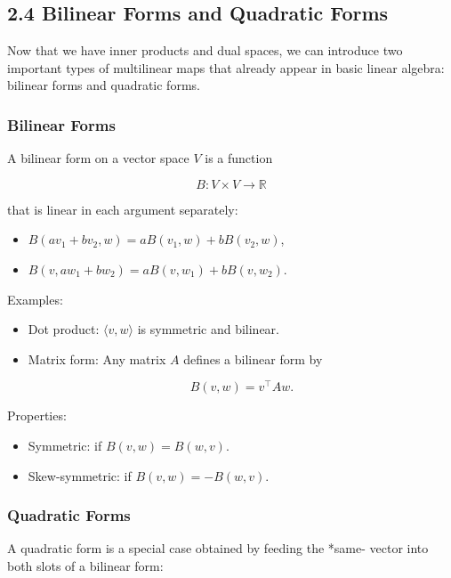 \documentclass[
  letterpaper,
  DIV=11,
  numbers=noendperiod]{scrreprt}
\providecommand{\tightlist}{%
  \setlength{\itemsep}{0pt}\setlength{\parskip}{0pt}}
\begin{document}
\subsection{2.4 Bilinear Forms and Quadratic
Forms}\label{bilinear-forms-and-quadratic-forms}

Now that we have inner products and dual spaces, we can introduce two
important types of multilinear maps that already appear in basic linear
algebra: bilinear forms and quadratic forms.

\subsubsection{Bilinear Forms}\label{bilinear-forms}

A bilinear form on a vector space \(V\) is a function

\[
B: V \times V \to \mathbb{R}
\]

that is linear in each argument separately:

\begin{itemize}
\tightlist
\item
  \(B(av_1 + bv_2, w) = aB(v_1, w) + bB(v_2, w)\),
\item
  \(B(v, aw_1 + bw_2) = aB(v, w_1) + bB(v, w_2)\).
\end{itemize}

Examples:

\begin{itemize}
\item
  Dot product: \(\langle v,w\rangle\) is symmetric and bilinear.
\item
  Matrix form: Any matrix \(A\) defines a bilinear form by

  \[
  B(v,w) = v^\top A w.
  \]
\end{itemize}

Properties:

\begin{itemize}
\tightlist
\item
  Symmetric: if \(B(v,w) = B(w,v)\).
\item
  Skew-symmetric: if \(B(v,w) = -B(w,v)\).
\end{itemize}

\subsubsection{Quadratic Forms}\label{quadratic-forms}

A quadratic form is a special case obtained by feeding the *same- vector
into both slots of a bilinear form:
\end{document}
